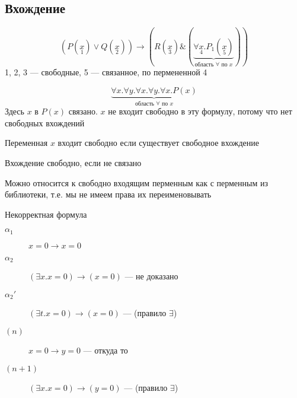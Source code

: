 \documentclass[english]{article}
\begin{document}
\subsection{Вхождение}
\label{sec:orgfec75ff}
\begin{examp}
	\[ (P(\underset{1}{x}) \vee Q(\underset{2}{x})) \to (R(\underset{3}{x}) \& (\underbrace{\forall \underset{4}{x}. P_1(\underset{5}{x})}_{\text{область }\forall\text{ по }x})) \]
	1, 2, 3 --- свободные, 5 --- связанное, по пермененной 4
\end{examp}
\begin{examp}
	\[ \underbrace{\forall x. \forall y. \forall x. \forall y. \forall x. P(x)}_{\text{область }\forall\text{ по }x} \]
	Здесь \(x\) в \(P(x)\) связано. \(x\) не входит свободно в эту формулу, потому что нет свободных вхождений
\end{examp}
\begin{definition}
	Переменная \(x\) входит свободно если существует свободное вхождение
\end{definition}
\begin{definition}
	Вхождение свободно, если не связано
\end{definition}
Можно относится к свободно входящим перменным как с перменным из библиотеки, т.е. мы не имеем права их переименовывать
\begin{examp}
	Некорректная формула
	\begin{description}
		\item[{\(\alpha_1\)}] \(x = 0 \to x = 0\)
		\item[{\(\alpha_2\)}] \color{red}\((\exists x. x = 0) \to (x = 0)\) --- не доказано\color{black}
		\item[{\(\alpha_2'\)}] \((\exists t. x = 0) \to (x = 0)\) --- (правило \(\exists\))
	\end{description}
\end{examp}
\begin{examp}
	\-
	\begin{description}
		\item[{\((n)\)}] \(x = 0 \to y = 0\) --- откуда то
		\item[{\((n + 1)\)}] \((\exists x. x = 0) \to (y = 0)\) --- (правило \(\exists\))
	\end{description}
\end{examp}
\end{document}
